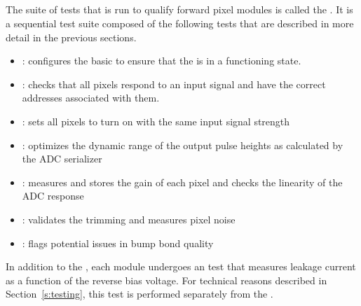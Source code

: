 
\newpage

\subsection{\fulltest}
\label{ss:fulltest}

The suite of tests that is run to qualify forward pixel modules is called the
\fulltest. It is a sequential test suite composed of the following tests
that are described in more detail in the previous sections.
\begin{itemize}
  \item \pretest: configures the basic \dacs to ensure that the \roc is in a functioning state.
  \item \alivetest: checks that all pixels respond to an input signal and have the correct addresses associated with them.
  \item \trimming: sets all pixels to turn on with the same input signal strength
  \item \phopt: optimizes the dynamic range of the output pulse heights as calculated by the ADC serializer
  \item \gainped: measures and stores the gain of each pixel and checks the linearity of the ADC response
  \item \scurves: validates the trimming and measures pixel noise
  \item \bb: flags potential issues in bump bond quality
\end{itemize}
In addition to the \fulltest, each module undergoes an \iv test that measures leakage current as a function of the reverse bias voltage.
For technical reasons described in Section~\ref{s:testing}, this test is performed separately from the \fulltest.
